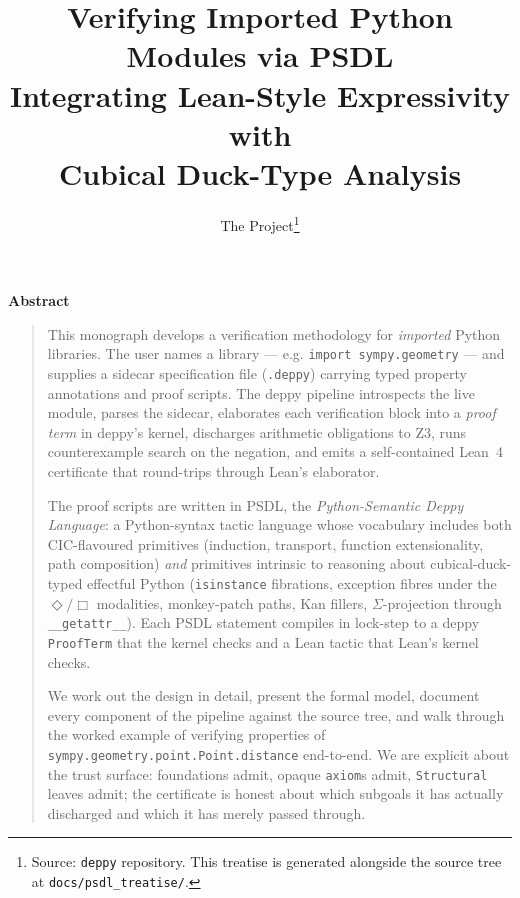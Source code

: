 \documentclass[11pt,letterpaper,oneside]{book}
\title{
\textbf{Verifying Imported Python Modules via PSDL}\\[0.55em]
\Large{Integrating Lean-Style Expressivity with\\
Cubical Duck-Type Analysis}
}
\author{The \Deppy{} Project\thanks{Source: \texttt{deppy} repository.
This treatise is generated alongside the source tree at
\texttt{docs/psdl\_treatise/}.}}
\date{}
\theoremstyle{plain}
\theoremstyle{definition}
\theoremstyle{remark}
\newcommand{\PSDL}{\textsf{PSDL}}
\newcommand{\Deppy}{\textsf{deppy}}
\newcommand{\Lean}{\textsf{Lean}}
\newcommand{\Zthree}{\textsf{Z3}}
\newcommand{\CIC}{\textsc{CIC}}
\newcommand{\printtreatisebib}{\printbibliography}%
\newcommand{\printtreatisebib}{%
  }%
\newenvironment{abstract}{%
  \begin{center}\textbf{\Large Abstract}\end{center}%
  \begin{quote}\noindent
}{%
  \end{quote}%
}
\begin{document}
\frontmatter
\maketitle

\begin{abstract}
\noindent
This monograph develops a verification methodology for \emph{imported}
Python libraries.  The user names a library --- e.g. \texttt{import
sympy.geometry} --- and supplies a sidecar specification file
(\texttt{.deppy}) carrying typed property annotations and proof scripts.
The \Deppy{} pipeline introspects the live module, parses the sidecar,
elaborates each verification block into a \emph{proof term} in
\Deppy's kernel, discharges arithmetic obligations to \Zthree, runs
counterexample search on the negation, and emits a self-contained
\Lean{}~4 certificate that round-trips through Lean's elaborator.

The proof scripts are written in \PSDL{}, the \emph{Python-Semantic
Deppy Language}: a Python-syntax tactic language whose vocabulary
includes both \CIC{}-flavoured primitives (induction, transport,
function extensionality, path composition) \emph{and} primitives
intrinsic to reasoning about cubical-duck-typed effectful Python
(\texttt{isinstance} fibrations, exception fibres under the
$\Diamond/\Box$ modalities, monkey-patch paths, Kan fillers,
$\Sigma$-projection through \texttt{\_\_getattr\_\_}).  Each \PSDL{}
statement compiles in lock-step to a \Deppy{} \texttt{ProofTerm} that
the kernel checks and a \Lean{} tactic that Lean's kernel checks.

We work out the design in detail, present the formal model, document
every component of the pipeline against the source tree, and walk
through the worked example of verifying properties of
\texttt{sympy.geometry.point.Point.distance} end-to-end.  We are
explicit about the trust surface: foundations admit, opaque
\texttt{axiom}s admit, \texttt{Structural} leaves admit; the
certificate is honest about which subgoals it has actually
discharged and which it has merely passed through.
\end{abstract}

\tableofcontents

\mainmatter















\backmatter

\printtreatisebib
\end{document}
